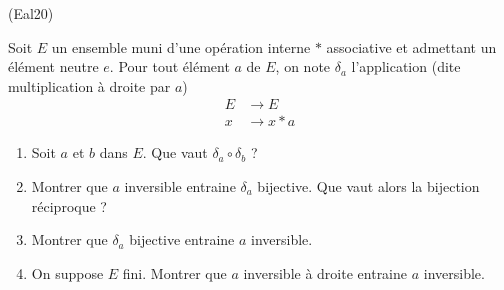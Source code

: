 \begin{tiny}(Eal20)\end{tiny} Soit $E$ un ensemble muni d'une opération interne $*$ associative et admettant un élément neutre $e$. Pour tout élément $a$ de $E$, on note $\delta_a$ l'application (dite multiplication à droite par $a$)
\begin{align*}
 E &\rightarrow E \\
 x &\rightarrow x*a
\end{align*}
\begin{enumerate}
\item Soit $a$ et $b$ dans $E$. Que vaut $\delta_a \circ \delta_b$ ?
 \item Montrer que $a$ inversible entraine $\delta_a$ bijective. Que vaut alors la bijection réciproque ?
\item Montrer que $\delta_a$ bijective entraine $a$ inversible.
\item On suppose $E$ fini. Montrer que $a$ inversible à droite entraine $a$ inversible.
\end{enumerate}
